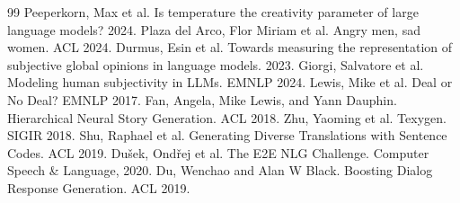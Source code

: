 \begin{thebibliography}{99}
 Peeperkorn, Max et al. Is temperature the creativity parameter of large language models? 2024.
 Plaza del Arco, Flor Miriam et al. Angry men, sad women. ACL 2024.
 Durmus, Esin et al. Towards measuring the representation of subjective global opinions in language models. 2023.
 Giorgi, Salvatore et al. Modeling human subjectivity in LLMs. EMNLP 2024.
 Lewis, Mike et al. Deal or No Deal? EMNLP 2017.
 Fan, Angela, Mike Lewis, and Yann Dauphin. Hierarchical Neural Story Generation. ACL 2018.
 Zhu, Yaoming et al. Texygen. SIGIR 2018.
 Shu, Raphael et al. Generating Diverse Translations with Sentence Codes. ACL 2019.
 Du{\v{s}}ek, Ond{\v{r}}ej et al. The E2E NLG Challenge. Computer Speech \& Language, 2020.
 Du, Wenchao and Alan W Black. Boosting Dialog Response Generation. ACL 2019.
\end{thebibliography}
